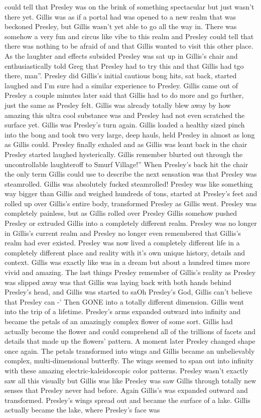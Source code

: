 \documentclass[12pt]{book}
\begin{document}
could tell that Presley was on the brink of something spectacular but just wasn't there yet. Gillis was as if a portal had was opened to a new realm that was beckoned Presley, but Gillis wasn't yet able to go all the way in. There was somehow a very fun and circus like vibe to this realm and Presley could tell that there was nothing to be afraid of and that Gillis wanted to visit this other place. As the laughter and effects subsided Presley was sat up in Gillis's chair and enthusiastically told Greg that Presley had to try this and that Gillis had tgo there, man''. Presley did Gillis's initial cautious bong hits, sat back, started laughed and I'm sure had a similar experience to Presley. Gillis came out of Presley a couple minutes later said that Gillis had to do more and go further, just the same as Presley felt. Gillis was already totally blew away by how amazing this ultra cool substance was and Presley had not even scratched the surface yet. Gillis was Presley's turn again. Gillis loaded a healthy sized pinch into the bong and took two very large, deep hauls, held Presley in almost as long as Gillis could. Presley finally exhaled and as Gillis was leant back in the chair Presley started laughed hysterically. Gillis remember blurted out through the uncontrollable laughteroff to Smurf Village!'' When Presley's back hit the chair the only term Gillis could use to describe the next sensation was that Presley was steamrolled. Gillis was absolutely fucked steamrolled! Presley was like something way bigger than Gillis and weighed hundreds of tons, started at Presley's feet and rolled up over Gillis's entire body, transformed Presley as Gillis went. Presley was completely painless, but as Gillis rolled over Presley Gillis somehow pushed Presley or extruded Gillis into a completely different realm. Presley was no longer in Gillis's current realm and Presley no longer even remembered that Gillis's realm had ever existed. Presley was now lived a completely different life in a completely different place and reality with it's own unique history, details and context. Gillis was exactly like was in a dream but about a hundred times more vivid and amazing. The last things Presley remember of Gillis's reality as Presley was slipped away was that Gillis was laying back with both hands behind Presley's head, and Gillis was started to saOh Presley's God, Gillis can't believe that Presley can -' Then GONE into a totally different dimension. Gillis went into the trip of a lifetime. Presley's arms expanded outward into infinity and became the petals of an amazingly complex flower of some sort. Gillis had actually become the flower and could comprehend all of the trillions of facets and details that made up the flowers' pattern. A moment later Presley changed shape once again. The petals transformed into wings and Gillis became an unbelievably complex, multi-dimensional butterfly. The wings seemed to span out into infinity with these amazing electric-kaleidoscopic color patterns. Presley wasn't exactly saw all this visually but Gillis was like Presley was saw Gillis through totally new senses that Presley never had before. Again Gillis's was expanded outward and transformed. Presley's wings spread out and became the surface of a lake. Gillis actually became the lake, where Presley's face was 
\end{document}

